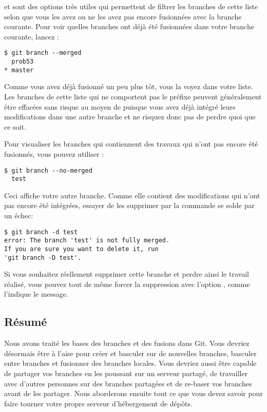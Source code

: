  et  sont des options très utiles qui permettent de filtrer les branches de cette liste selon que vous les avez ou ne les avez pas encore fusionnées avec la branche courante.
Pour voir quelles branches ont déjà été fusionnées dans votre branche courante, lancez :
\begin{Schunk}
\begin{Verbatim}
$ git branch --merged
  prob53
* master
\end{Verbatim}
\end{Schunk}

Comme vous avez déjà fusionné  un peu plus tôt, vous la voyez dans votre liste.
Les branches de cette liste qui ne comportent pas le préfixe \code{*} peuvent généralement être effacées sans risque au moyen de  puisque vous avez déjà intégré leurs modifications dans une autre branche et ne risquez donc pas de perdre quoi que ce soit.

Pour visualiser les branches qui contiennent des travaux qui n'ont pas encore été fusionnés, vous pouvez utiliser   :
\begin{Schunk}
\begin{Verbatim}
$ git branch --no-merged
  test
\end{Verbatim}
\end{Schunk}

Ceci affiche votre autre branche.
Comme elle contient des modifications qui n'ont pas encore été intégrées, essayer de les supprimer par la commande  se solde par un échec:
\begin{Schunk}
\begin{Verbatim}
$ git branch -d test
error: The branch 'test' is not fully merged.
If you are sure you want to delete it, run
'git branch -D test'.
\end{Verbatim}
\end{Schunk}

Si vous souhaitez réellement supprimer cette branche et perdre ainsi le travail réalisé, vous pouvez tout de même forcer la suppression avec l'option , comme l'indique le message.

\subsection{Résumé}

Nous avons traité les bases des branches et des fusions dans Git.
Vous devriez désormais être à l'aise pour créer et basculer sur de nouvelles branches, basculer entre branches et fusionner des branches locales.
Vous devriez aussi être capable de partager vos branches en les poussant sur un serveur partagé, de travailler avec d'autres personnes sur des branches partagées et de re-baser vos branches avant de les partager.
Nous aborderons ensuite tout ce que vous devez savoir pour faire tourner votre propre serveur d'hébergement de dépôts.

